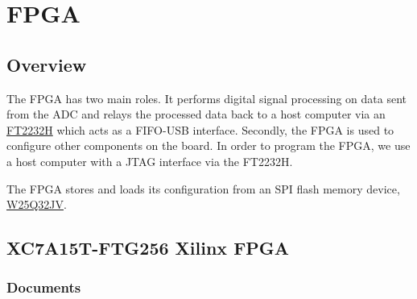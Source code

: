 \section{FPGA}
\label{sec:fpga}

\subsection{Overview}
\label{sec:fpga-overview}

The FPGA has two main roles. It performs digital signal processing on data sent from the ADC and
relays the processed data back to a host computer via an \hyperlink{sec:ft2232h}{FT2232H} which acts
as a FIFO-USB interface. Secondly, the FPGA is used to configure other components on the board. In
order to program the FPGA, we use a host computer with a JTAG interface via the FT2232H.

The FPGA stores and loads its configuration from an SPI flash memory device,
\hyperlink{sec:w25q32jv}{W25Q32JV}.

\subsection{XC7A15T-FTG256 Xilinx FPGA}
\label{sec:xc7a15t-ftg256}

\subsubsection{Documents}
\label{sec:xc7a15t-ftg256-documents}

